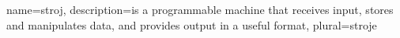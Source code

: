 {
  name={stroj},
  description={is a programmable machine that receives input,
               stores and manipulates data, and provides
               output in a useful format},
  plural={stroje}
}